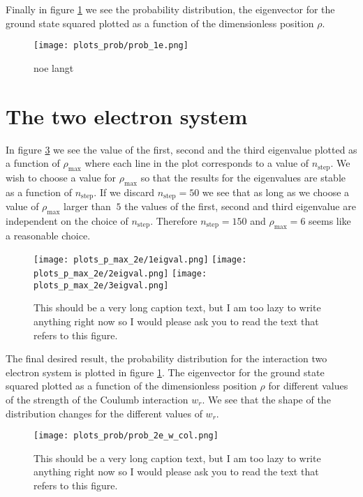 \documentclass[11pt,a4wide]{article}
\begin{document}
Finally in figure \ref{fig: prob_1e} we see the probability distribution, the eigenvector for the ground state squared plotted as a function of the dimensionless position $\rho$.

\begin{figure} [h!]
\centering
\texttt{[image: plots\_prob/prob\_1e.png]}
\caption{noe langt}
\label{fig: prob_1e}
\end{figure}

\section*{The two electron system}
In figure \ref{fig: prob_2e_w_col} we see the value of the first, second and the third eigenvalue plotted as a function of $\rho_{\mathrm{max}}$ where each line in the plot corresponds to a value of $n_{\mathrm{step}}$. We wish to choose a value for $\rho_{\mathrm{max}}$ so that the results for the eigenvalues are stable as a function of $n_{\mathrm{step}}$. If we discard $n_{\mathrm{step}}=50$ we see that as long as we choose a value of $\rho_{\mathrm{max}}$ larger than $~5$ the values of the first, second and third eigenvalue are independent on the choice of $n_{\mathrm{step}}$. Therefore $n_{\mathrm{step}}=150$ and $\rho_{\mathrm{max}}=6$ seems like a reasonable choice.

\begin{figure} [ht]
\centering
\texttt{[image: plots\_p\_max\_2e/1eigval.png]}
\texttt{[image: plots\_p\_max\_2e/2eigval.png]}
\texttt{[image: plots\_p\_max\_2e/3eigval.png]}
\caption{This should be a very long caption text, but I am too lazy to write anything right now so I would please ask you to read the text that refers to this figure.}
\label{fig: p_max_2e_w_col}
\end{figure}

The final desired result, the probability distribution for the interaction two electron system is plotted in figure \ref{fig: prob_1e}. The eigenvector for the ground state squared plotted as a function of the dimensionless position $\rho$ for different values of the strength of the Coulumb interaction $w_r$. We see that the shape of the distribution changes for the different values of $w_r$. 

\begin{figure} [ht]
\centering
\texttt{[image: plots\_prob/prob\_2e\_w\_col.png]}
\caption{This should be a very long caption text, but I am too lazy to write anything right now so I would please ask you to read the text that refers to this figure.}
\label{fig: prob_2e_w_col}
\end{figure}
\end{document}

